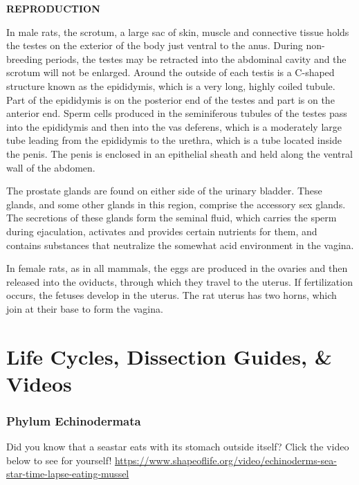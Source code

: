 \documentclass[
]{book}
\begin{document}
\textbf{REPRODUCTION}

In male rats, the scrotum, a large sac of skin, muscle and connective tissue holds the testes on
the exterior of the body just ventral to the anus. During non-breeding periods, the testes may be retracted into the abdominal cavity and the scrotum will not be enlarged. Around the outside of each testis is a C-shaped structure known as the epididymis, which is a very long, highly coiled
tubule. Part of the epididymis is on the posterior end of the testes and part is on the anterior end. Sperm cells produced in the seminiferous tubules of the testes pass into the epididymis and then into the vas deferens, which is a moderately large tube leading from the epididymis to the urethra, which is a tube located inside the penis. The penis is enclosed in an epithelial sheath and held along the ventral wall of the abdomen.

The prostate glands are found on either side of the urinary bladder. These glands, and some other glands in this region, comprise the accessory sex glands. The secretions of these glands form the seminal fluid, which carries the sperm during ejaculation, activates and provides certain nutrients for them, and contains substances that neutralize the somewhat acid environment in
the vagina.

In female rats, as in all mammals, the eggs are produced in the ovaries and then released into the
oviducts, through which they travel to the uterus. If fertilization occurs, the fetuses develop in the uterus. The rat uterus has two horns, which join at their base to form the vagina.

\hypertarget{life-cycles-dissection-guides-videos-1}{%
\chapter*{Life Cycles, Dissection Guides, \& Videos}\label{life-cycles-dissection-guides-videos-1}}

\hypertarget{phylum-echinodermata-1}{%
\subsection*{Phylum Echinodermata}\label{phylum-echinodermata-1}}

Did you know that a seastar eats with its stomach outside itself? Click the video below to see for yourself! \url{https://www.shapeoflife.org/video/echinoderms-sea-star-time-lapse-eating-mussel}
\end{document}
